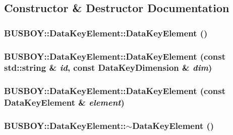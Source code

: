 \subsection{Constructor \& Destructor Documentation}
\hypertarget{classBUSBOY_1_1DataKeyElement_a07b9a18632a9f33d2c263c3af3319070}{
\subsubsection[{DataKeyElement}]{\setlength{\rightskip}{0pt plus 5cm}BUSBOY::DataKeyElement::DataKeyElement ()}}
\label{classBUSBOY_1_1DataKeyElement_a07b9a18632a9f33d2c263c3af3319070}
\hypertarget{classBUSBOY_1_1DataKeyElement_a977005ecb31cb4f751fc77b80b64e17a}{
\subsubsection[{DataKeyElement}]{\setlength{\rightskip}{0pt plus 5cm}BUSBOY::DataKeyElement::DataKeyElement (const std::string \& {\em id}, \/  const {\bf DataKeyDimension} \& {\em dim})}}
\label{classBUSBOY_1_1DataKeyElement_a977005ecb31cb4f751fc77b80b64e17a}
\hypertarget{classBUSBOY_1_1DataKeyElement_a344e097aa9c537d86c2b000cb23bcffa}{
\subsubsection[{DataKeyElement}]{\setlength{\rightskip}{0pt plus 5cm}BUSBOY::DataKeyElement::DataKeyElement (const {\bf DataKeyElement} \& {\em element})}}
\label{classBUSBOY_1_1DataKeyElement_a344e097aa9c537d86c2b000cb23bcffa}
\hypertarget{classBUSBOY_1_1DataKeyElement_af290e8a4dc942b2b490802cd4f712a46}{
\subsubsection[{$\sim$DataKeyElement}]{\setlength{\rightskip}{0pt plus 5cm}BUSBOY::DataKeyElement::$\sim$DataKeyElement ()}}
\label{classBUSBOY_1_1DataKeyElement_af290e8a4dc942b2b490802cd4f712a46}



